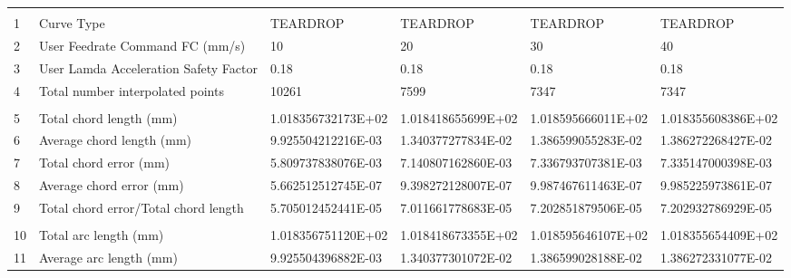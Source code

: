 

\begin{tabular}{ p{0.5cm} p{8.0cm} p{4.00cm} p{4.0cm} p{4.00cm} p{4.0cm}}
\hline
	&                                                      &                    &                      &                    & \\
1	& Curve Type	                                       & TEARDROP	        & TEARDROP	           & TEARDROP           &	TEARDROP \\
2	& User Feedrate Command FC (mm/s)                      &	10	            &    20                &	30	            &    40 \\
3	& User Lamda Acceleration Safety Factor	               &   0.18             &	0.18               &   0.18             &   0.18 \\
4	& Total number interpolated points	                   &   10261            &	7599	           &   7347             &	7347 \\
	&                                                      &                    &                      &                    & \\
5	& Total chord length (mm)	                           & 1.018356732173E+02 & 1.018418655699E+02 & 1.018595666011E+02 & 1.018355608386E+02 \\
6	& Average chord length (mm)	                           & 9.925504212216E-03	& 1.340377277834E-02 & 1.386599055283E-02 & 1.386272268427E-02 \\
7	& Total chord error (mm)	                           & 5.809737838076E-03	& 7.140807162860E-03 & 7.336793707381E-03 & 7.335147000398E-03 \\
8	& Average chord error (mm)	                           & 5.662512512745E-07	& 9.398272128007E-07 & 9.987467611463E-07 & 9.985225973861E-07 \\
9	& Total chord error/Total chord length                 & 5.705012452441E-05	& 7.011661778683E-05 & 7.202851879506E-05 & 7.202932786929E-05\\
	&                                                      &                    &                    &                    & \\
10	& Total arc length (mm)	                               & 1.018356751120E+02	& 1.018418673355E+02 & 1.018595646107E+02 & 1.018355654409E+02\\
11	& Average arc length (mm)	                           & 9.925504396882E-03	& 1.340377301072E-02 & 1.386599028188E-02 & 1.386272331077E-02 \\

\end{tabular}

